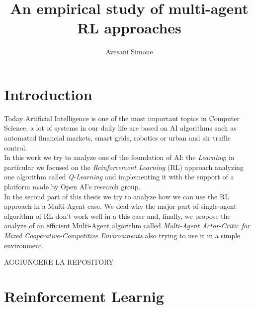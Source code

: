 \documentclass[]{report}
\title{An empirical study of multi-agent RL approaches}
\author{Avesani Simone}
\date{}
\begin{document}
\maketitle
\newpage
\tableofcontents
\newpage



\chapter{Introduction}
Today Artificial Intelligence is one of the most important topics in Computer Science, a lot of systems in our daily life are based on AI algorithms such as automated financial markets, smart grids, robotics or urban and air traffic control.\\
In this work we try to analyze one of the foundation of AI: the \emph{Learning}; in particular we focused on the \emph{Reinforcement Learning} (RL) approach analyzing one algorithm called \emph{Q-Learning} and implementing it with the support of a platform made by Open AI's research group.\\
In the second part of this thesis we try to analyze how we can use the RL approach in a Multi-Agent case. We deal why the major part of single-agent algorithm of RL don't work well in a this case and, finally, we propose the analyze of an efficient Multi-Agent algorithm called \emph{Multi-Agent Actor-Critic for Mixed Cooperative-Competitive Environments} also trying to use it in a simple environment.

AGGIUNGERE LA REPOSITORY

\chapter{Reinforcement Learnig}\label{reinforcement-learnig}
\end{document}
